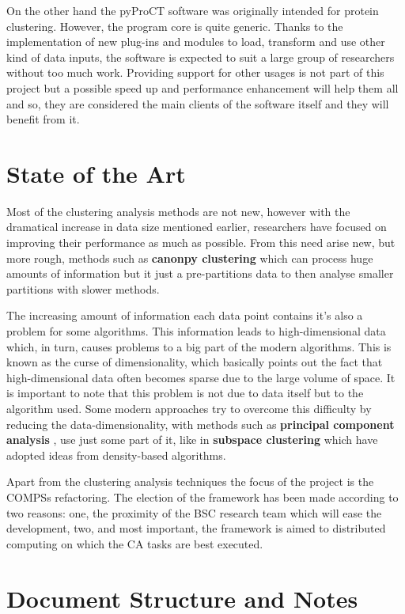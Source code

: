 On the other hand the pyProCT software was originally intended for protein clustering. However, the program core is quite generic. Thanks to the implementation of new plug-ins and modules to load, transform and use other kind of data inputs, the software is expected to suit a large group of researchers without too much work. Providing support for other usages is not part of this project but a possible speed up and performance enhancement will help them all and so, they are considered the main clients of the software itself and they will benefit from it.

\section{State of the Art}


Most of the clustering analysis methods are not new, however with the dramatical increase in data size mentioned earlier, researchers have focused on improving their performance as much as possible. From this need arise new, but more rough, methods such as \textbf{canonpy clustering} \cite{Nayak2015} which can process huge amounts of information but it just a pre-partitions data to then analyse smaller partitions with slower methods.

The increasing amount of information each data point contains it's also a problem for some algorithms. This information leads to high-dimensional data which, in turn, causes problems to a big part of the modern algorithms. This is known as the curse of dimensionality, which basically points out the fact that high-dimensional data often becomes sparse due to the large volume of space. It is important to note that this problem is not due to data itself but to the algorithm used. Some modern approaches try to overcome this difficulty by reducing the data-dimensionality, with  methods such as \textbf{principal component analysis} \cite{Kupski2015}, use just some part of it, like in \textbf{subspace clustering} \cite{Adler2015} which have adopted ideas from density-based algorithms.

Apart from the clustering analysis techniques the focus of the project is the COMPSs refactoring. The election of the framework has been made according to two reasons: one, the proximity of the BSC research team which will ease the development, two, and most important, the framework is aimed to distributed computing on which the CA tasks are best executed. 


\section{Document Structure and Notes}

